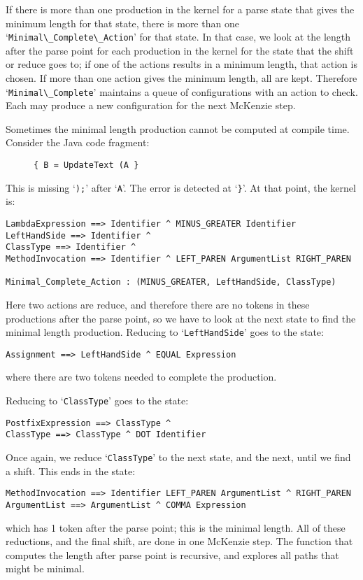 \documentclass[authordraft]{acmart}
\newcommand{\code}[1]{`\lstinline|#1|'}
\begin{document}
If there is more than one production in the kernel for a parse state
that gives the minimum length for that state, there is more than one
\code{Minimal\_Complete\_Action} for that state. In that case, we look
at the length after the parse point for each production in the kernel
for the state that the shift or reduce goes to; if one of the actions
results in a minimum length, that action is chosen. If more than one
action gives the minimum length, all are kept. Therefore
\code{Minimal\_Complete} maintains a queue of configurations with an
action to check. Each may produce a new configuration for the next
McKenzie step.

Sometimes the minimal length production cannot be computed at compile
time. Consider the Java code fragment:
\begin{figure}[H]
  \small{
    \begin{lstlisting}
{ B = UpdateText (A }
    \end{lstlisting}
    }
\caption{}
\label{ex:recursive_length_after_dot}
\end{figure}
This is missing \code{);} after \code{A}. The error is detected at
`\lstinline|}|'. At that point, the kernel is:
\begin{verbatim}
LambdaExpression ==> Identifier ^ MINUS_GREATER Identifier
LeftHandSide ==> Identifier ^
ClassType ==> Identifier ^
MethodInvocation ==> Identifier ^ LEFT_PAREN ArgumentList RIGHT_PAREN

Minimal_Complete_Action : (MINUS_GREATER, LeftHandSide, ClassType)
\end{verbatim}
Here two actions are reduce, and therefore there are no tokens in
these productions after the parse point, so we have to look at the
next state to find the minimal length production. Reducing to
\code{LeftHandSide} goes to the state:
\begin{verbatim}
Assignment ==> LeftHandSide ^ EQUAL Expression
\end{verbatim}
where there are two tokens needed to complete the production.

Reducing to \code{ClassType} goes to the state:
\begin{verbatim}
PostfixExpression ==> ClassType ^
ClassType ==> ClassType ^ DOT Identifier
\end{verbatim}
Once again, we reduce \code{ClassType} to the next state, and the
next, until we find a shift. This ends in the state:
\begin{verbatim}
MethodInvocation ==> Identifier LEFT_PAREN ArgumentList ^ RIGHT_PAREN
ArgumentList ==> ArgumentList ^ COMMA Expression
\end{verbatim}
which has 1 token after the parse point; this is the minimal length.
All of these reductions, and the final shift, are done in one McKenzie
step. The function that computes the length after parse point is
recursive, and explores all paths that might be minimal.
\end{document}
